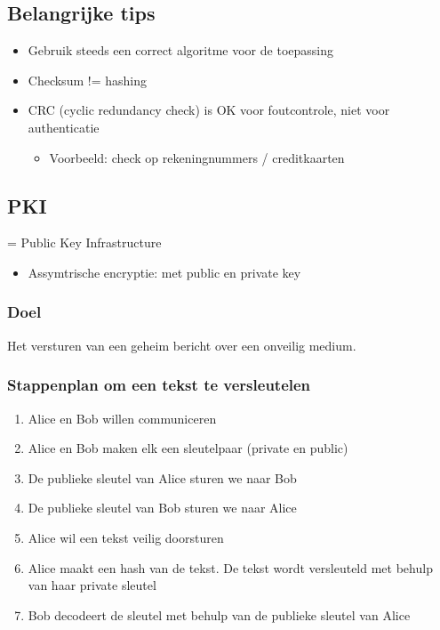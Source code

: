 \documentclass{article}
\begin{document}
\subsection{Belangrijke tips}

\begin{itemize}
    \item Gebruik steeds een correct algoritme voor de toepassing
    \item Checksum != hashing
    \item CRC (cyclic redundancy check) is OK voor foutcontrole, niet voor authenticatie
    \begin{itemize}
        \item Voorbeeld: check op rekeningnummers / creditkaarten
    \end{itemize} 
\end{itemize}

\subsection{PKI}

= Public Key Infrastructure

\begin{itemize}
    \item Assymtrische encryptie: met public en private key
\end{itemize}

\subsubsection{Doel}

Het versturen van een geheim bericht over een onveilig medium.

\subsubsection{Stappenplan om een tekst te versleutelen}

\begin{enumerate}
    \item Alice en Bob willen communiceren
    \item Alice en Bob maken elk een sleutelpaar (private en public)
    \item De publieke sleutel van Alice sturen we naar Bob
    \item De publieke sleutel van Bob sturen we naar Alice
    \item Alice wil een tekst veilig doorsturen
    \item Alice maakt een hash van de tekst. De tekst wordt versleuteld met behulp van haar private sleutel
    \item Bob decodeert de sleutel met behulp van de publieke sleutel van Alice
\end{enumerate}
\end{document}
